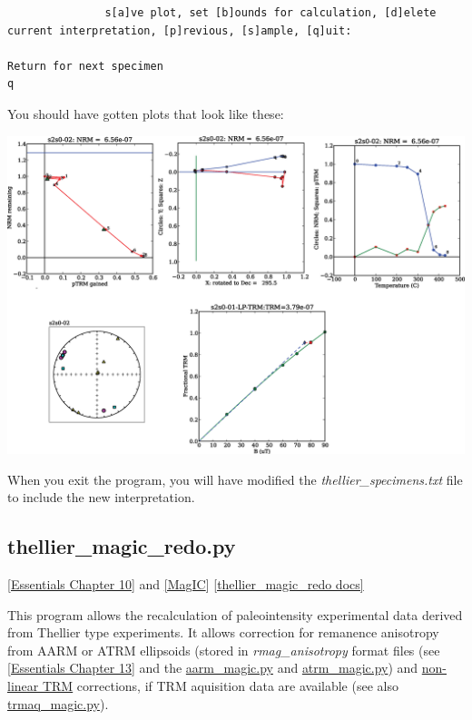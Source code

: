 \documentclass[11pt]{book}
\begin{document}
{{\begin{verbatim}
               s[a]ve plot, set [b]ounds for calculation, [d]elete current interpretation, [p]revious, [s]ample, [q]uit:
               
Return for next specimen 
q
\end{verbatim}

You should have gotten plots that look like these:

\includegraphics[width=15cm]{EPSfiles/thellier_magic.eps}



When you exit the program, you will have modified the {\it thellier\_specimens.txt} file to include the new interpretation.  
 

\subsection{thellier\_magic\_redo.py}
\href{http://magician.ucsd.edu/Essentials_2/WebBook2ch10.html#ch10}{[Essentials Chapter 10]} and \href{#MagIC}{[MagIC}]
\href{http://earthref.org/PmagPy/pmagpydocs/thellier_magic_redo-module.html}{[thellier\_magic\_redo docs]}

This program allows the recalculation of paleointensity experimental data derived from Thellier type experiments.  It allows correction for remanence  anisotropy from AARM or ATRM ellipsoids (stored in {\it rmag\_anisotropy} format files (see \href{http://magician.ucsd.edu/Essentials_2/WebBook2ch13.html#ch13}{[Essentials Chapter 13]} and the \href{#aarm_magic.py}{aarm\_magic.py} and \href{#atrm_magic.py}{atrm\_magic.py}) and \href{http://magician.ucsd.edu/Essentials_2/WebBook2ch10.html#non-linear_TRM}{non-linear TRM} corrections, if TRM aquisition data are available (see also \href{#trmaq_magic.py}{trmaq\_magic.py}).   


}}
\end{document}
